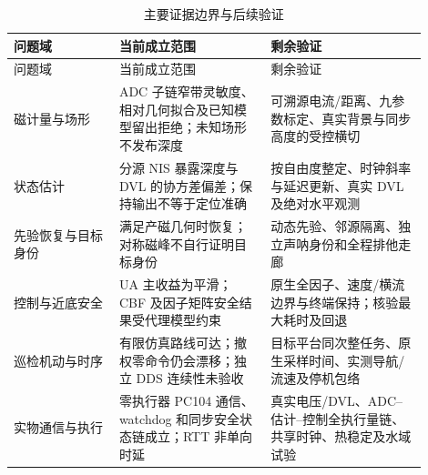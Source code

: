 \begin{longtable}{@{}>{\raggedright\arraybackslash}p{0.23\linewidth}>{\raggedright\arraybackslash}p{0.33\linewidth}>{\raggedright\arraybackslash}p{0.34\linewidth}@{}}
\caption{主要证据边界与后续验证}\label{tab:ch05-negative-results}\\
\toprule
问题域 & 当前成立范围 & 剩余验证\\
\midrule
\endfirsthead
\toprule
问题域 & 当前成立范围 & 剩余验证\\
\midrule
\endhead
\bottomrule
\endfoot
磁计量与场形 & ADC 子链窄带灵敏度、相对几何拟合及已知模型留出拒绝；未知场形不发布深度 & 可溯源电流/距离、九参数标定、真实背景与同步高度的受控横切\\
状态估计 & 分源 NIS 暴露深度与 DVL 的协方差偏差；保持输出不等于定位准确 & 按自由度整定、时钟斜率与延迟更新、真实 DVL 及绝对水平观测\\
先验恢复与目标身份 & 满足产磁几何时恢复；对称磁峰不自行证明目标身份 & 动态先验、邻源隔离、独立声呐身份和全程排他走廊\\
控制与近底安全 & UA 主收益为平滑；CBF 及因子矩阵安全结果受代理模型约束 & 原生全因子、速度/横流边界与终端保持；核验最大耗时及回退\\
巡检机动与时序 & 有限仿真路线可达；撤权零命令仍会漂移；独立 DDS 连续性未验收 & 目标平台同次整任务、原生采样时间、实测导航/流速及停机包络\\
实物通信与执行 & 零执行器 PC104 通信、watchdog 和同步安全状态链成立；RTT 非单向时延 & 真实电压/DVL、ADC--估计--控制全执行量链、共享时钟、热稳定及水域试验\\
\end{longtable}
